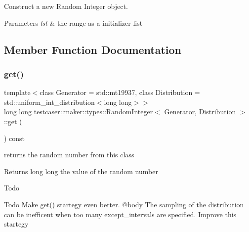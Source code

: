 Construct a new Random Integer object. 


\begin{DoxyParams}{Parameters}
{\em lst} & the range as a initializer list \\
\hline
\end{DoxyParams}


\subsection{Member Function Documentation}
\mbox{\label{classtestcaser_1_1maker_1_1types_1_1RandomInteger_a3b7754ca1c579f58b959ca6adb483a51}} 
\subsubsection{\texorpdfstring{get()}{get()}}
{\footnotesize\ttfamily template$<$class Generator = std\+::mt19937, class Distribution = std\+::uniform\+\_\+int\+\_\+distribution$<$long long$>$$>$ \\
long long \mbox{\hyperlink{classtestcaser_1_1maker_1_1types_1_1RandomInteger}{testcaser\+::maker\+::types\+::\+Random\+Integer}}$<$ Generator, Distribution $>$\+::get (\begin{DoxyParamCaption}{ }\end{DoxyParamCaption}) const\hspace{0.3cm}{\ttfamily [inline]}}



returns the random number from this class 

\begin{DoxyReturn}{Returns}
long long the value of the random number 
\end{DoxyReturn}
\begin{DoxyRefDesc}{Todo}
\item[\mbox{\hyperlink{todo__todo000002}{Todo}}]Make \mbox{\hyperlink{classtestcaser_1_1maker_1_1types_1_1RandomInteger_a3b7754ca1c579f58b959ca6adb483a51}{get()}} startegy even better. @body The sampling of the distribution can be inefficent when too many except\+\_\+intervals are specified. Improve this startegy\end{DoxyRefDesc}
\mbox{\label{classtestcaser_1_1maker_1_1types_1_1RandomInteger_afe7ef6baf52d095f5b17ad4f8d9e5f1a}} 
